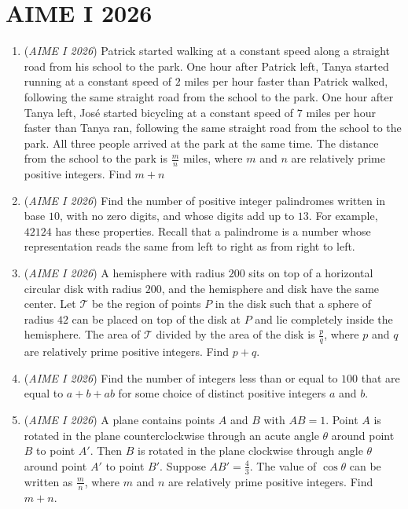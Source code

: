 \section{AIME I 2026}
        \begin{enumerate}
        	\item (\textit{AIME I 2026}) Patrick started walking at a constant speed along a straight road from his school to the park. One hour after Patrick left, Tanya started running at a constant speed of $2$ miles per hour faster than Patrick walked, following the same straight road from the school to the park. One hour after Tanya left, José started bicycling at a constant speed of $7$ miles per hour faster than Tanya ran, following the same straight road from the school to the park. All three people arrived at the park at the same time. The distance from the school to the park is $\frac{m}{n}$ miles, where $m$ and $n$ are relatively prime positive integers. Find $m+n$


	\item (\textit{AIME I 2026}) Find the number of positive integer palindromes written in base $10$, with no zero digits, and whose digits add up to $13$. For example, $42124$ has these properties. Recall that a palindrome is a number whose representation reads the same from left to right as from right to left.


 

	\item (\textit{AIME I 2026}) A hemisphere with radius $200$ sits on top of a horizontal circular disk with radius $200$, and the hemisphere and disk have the same center. Let $\mathcal{T}$ be the region of points $P$ in the disk such that a sphere of radius $42$ can be placed on top of the disk at $P$ and lie completely inside the hemisphere. The area of $\mathcal{T}$ divided by the area of the disk is $\frac{p}{q}$, where $p$ and $q$ are relatively prime positive integers. Find $p+q$.


 

	\item (\textit{AIME I 2026}) Find the number of integers less than or equal to $100$ that are equal to $a+b+ab$ for some choice of distinct positive integers $a$ and $b$.


 

	\item (\textit{AIME I 2026}) A plane contains points $A$ and $B$ with $AB=1$. Point $A$ is rotated in the plane counterclockwise through an acute angle $\theta$ around point $B$ to point $A'$. Then $B$ is rotated in the plane clockwise through angle $\theta$ around point $A'$ to point $B'$. Suppose $AB'=\frac{4}{3}$. The value of $\cos\theta$ can be written as $\frac{m}{n}$, where $m$ and $n$ are relatively prime positive integers. Find $m+n$.



\end{enumerate}

